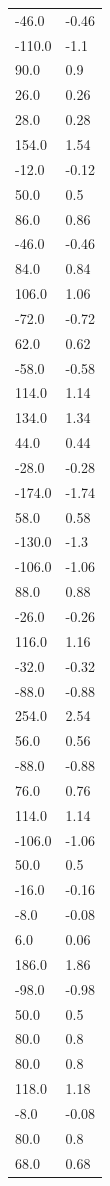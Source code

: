 \begin{longtable}{ll}
-46.0 & -0.46 \\
-110.0 & -1.1 \\
90.0 & 0.9 \\
26.0 & 0.26 \\
28.0 & 0.28 \\
154.0 & 1.54 \\
-12.0 & -0.12 \\
50.0 & 0.5 \\
86.0 & 0.86 \\
-46.0 & -0.46 \\
84.0 & 0.84 \\
106.0 & 1.06 \\
-72.0 & -0.72 \\
62.0 & 0.62 \\
-58.0 & -0.58 \\
114.0 & 1.14 \\
134.0 & 1.34 \\
44.0 & 0.44 \\
-28.0 & -0.28 \\
-174.0 & -1.74 \\
58.0 & 0.58 \\
-130.0 & -1.3 \\
-106.0 & -1.06 \\
88.0 & 0.88 \\
-26.0 & -0.26 \\
116.0 & 1.16 \\
-32.0 & -0.32 \\
-88.0 & -0.88 \\
254.0 & 2.54 \\
56.0 & 0.56 \\
-88.0 & -0.88 \\
76.0 & 0.76 \\
114.0 & 1.14 \\
-106.0 & -1.06 \\
50.0 & 0.5 \\
-16.0 & -0.16 \\
-8.0 & -0.08 \\
6.0 & 0.06 \\
186.0 & 1.86 \\
-98.0 & -0.98 \\
50.0 & 0.5 \\
80.0 & 0.8 \\
80.0 & 0.8 \\
118.0 & 1.18 \\
-8.0 & -0.08 \\
80.0 & 0.8 \\
68.0 & 0.68 \\

\end{longtable}
